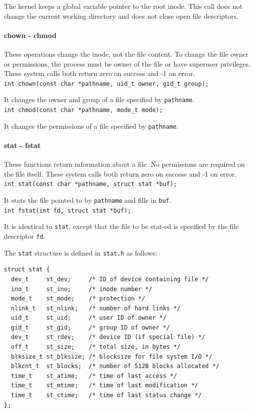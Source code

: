 \documentclass{report}
\begin{document}
The kernel keeps a global variable pointer to the root inode. This call does not change the current working directory and does not close open file descriptors.

\paragraph{chown - chmod}
These operations change the inode, not the file content. To change the file owner or permissions, the process must be owner of the file or have superuser privileges. These system calls both return zero on success and -1 on error.
\\
\texttt{int chown(const char *pathname, uid\_t owner, gid\_t group);}

It changes the owner and group of a file specified by \texttt{pathname}.
\\
\texttt{int chmod(const char *pathname, mode\_t mode);}

It changes the permissions of a file specified by \texttt{pathname}.

\paragraph{stat - fstat} These functions return information about a file. No permissions are required on the file itself. These system calls both return zero on success and -1 on error.
\\
\texttt{int stat(const char *pathname, struct stat *buf);}

It stats the file pointed to by \texttt{pathname} and fills in \texttt{buf}.
\\
\texttt{int fstat(int fd, struct stat *buf);}

It is identical to \texttt{stat}, except that the file to be stat-ed is specified by the file descriptor \texttt{fd}.

The \texttt{stat} structure is defined in \texttt{stat.h} as follows:

\begin{verbatim}
struct stat {
  dev_t     st_dev;     /* ID of device containing file */
  ino_t     st_ino;     /* inode number */
  mode_t    st_mode;    /* protection */
  nlink_t   st_nlink;   /* number of hard links */
  uid_t     st_uid;     /* user ID of owner */
  gid_t     st_gid;     /* group ID of owner */
  dev_t     st_rdev;    /* device ID (if special file) */
  off_t     st_size;    /* total size, in bytes */
  blksize_t st_blksize; /* blocksize for file system I/O */
  blkcnt_t  st_blocks;  /* number of 512B blocks allocated */
  time_t    st_atime;   /* time of last access */
  time_t    st_mtime;   /* time of last modification */
  time_t    st_ctime;   /* time of last status change */
};
\end{verbatim}
\end{document}
